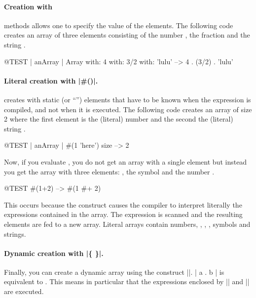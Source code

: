 \documentclass[a4paper,10pt,twoside]{book}
\begin{document}
\paragraph{Creation with }  methods allows one to specify the value of the elements.  
The following code creates an array of three elements consisting of the number , the fraction  and the string .

\begin{code}{@TEST | anArray |}
Array with: 4 with: 3/2 with: 'lulu' -->  {4 . (3/2) . 'lulu'}
\end{code}

\paragraph{Literal creation with \ct|\#()|.}
\ct{#()} creates  with static (or ``'') elements that have to be known when the expression is compiled, and not when it is executed. The following code creates an array of size 2 where the first element is the (literal) number  and the second the (literal) string .


\begin{code}{@TEST | anArray |}
#(1 'here') size --> 2
\end{code}

Now, if you evaluate , you do not get an array with a single element  but instead you get the array  \ie with three elements: , the symbol \ct{#+} and the number .

\begin{code}{@TEST}
#(1+2) -->  #(1 #+ 2)
\end{code}

\noindent
This occurs because the construct \ct{#()} causes the compiler to interpret literally the expressions contained in the array. The expression is scanned and the resulting elements are fed to a new array. Literal arrays contain numbers, , , , symbols and strings.

\paragraph{Dynamic creation with \ct|\{ \}|.}
Finally, you can create a dynamic array using the construct \ct|{}|. \ct|{ a . b }| is equivalent to . This means in particular that the expressions enclosed by \ct|{| and \ct|}| are executed. 
\end{document}
